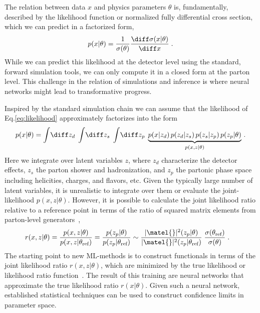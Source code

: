 \documentclass[submission,Phys]{SciPost}
\begin{document}
The relation between data $x$ and physics parameters $\theta$ is, fundamentally, described by the likelihood function or normalized fully differential cross section, which we can predict in a factorized form,
%
\begin{align}
  p(x|\theta)
  = \frac{1}{\sigma(\theta)} \frac{\diff \sigma(x|\theta)}{\diff x} \; . 
  \label{eq:likelihood}
\end{align}
%
While we can predict this likelihood at the detector level using the standard, forward simulation tools, we can only compute it in a closed form at the parton level. This challenge in the relation of simulations and inference is where neural networks might lead to transformative progress. 

Inspired by the standard simulation chain we can assume that the likelihood of Eq.\eqref{eq:likelihood} approximately factorizes into the form~\cite{Brehmer:2018kdj, Brehmer:2018eca}
%
\begin{align}
  p(x|\theta)
  = \int\!\diff z_d \; \int\!\diff z_s \; \int\!\diff z_p \;
  \underbrace{p(x|z_d) \, p(z_d|z_s) \, p(z_s|z_p) \, p(z_p|\theta)}_{p(x,z|\theta)} \,.
  \label{eq:latent}
\end{align}
%
Here we integrate over latent variables $z$, where $z_d$ characterize the detector effects, $z_s$ the parton shower and hadronization, and $z_p$ the partonic phase space including helicities, charges, and flavors, etc. Given the typically large number of latent variables, it is unrealistic to integrate over them or evaluate the joint-likelihood $p(x,z|\theta)$. However, it is possible to calculate the joint likelihood ratio relative to a reference point in terms of the ratio of squared matrix elements from parton-level generators~\cite{Brehmer:2018hga, Brehmer:2018kdj,Brehmer:2018eca, Stoye:2018ovl,Brehmer:2019xox},
%
\begin{align}
  r(x,z|\theta) &= \frac {p(x,z|\theta)} {p(x,z|\theta_\text{ref})}
  = \frac {p(z_p|\theta)} {p(z_p|\theta_\text{ref})}
  \sim \frac {|\matel{}|^2(z_p|\theta)} {|\matel{}|^2(z_p|\theta_\text{ref})} \; \frac {\sigma(\theta_\text{ref})} {\sigma(\theta)} \; .
  \label{eq:joint_llr}
\end{align}
%
The starting point to new ML-methods is to construct functionals in terms of the joint likelihood ratio $r(x,z|\theta)$, which are minimized by the true likelihood or likelihood ratio function~\cite{Cranmer:2015bka, Baldi:2016fzo}. The result of this training are neural networks that approximate the true likelihood ratio $r(x|\theta)$. Given such a neural network, established statistical techniques can be used to construct confidence limits in parameter space. 
\end{document}
